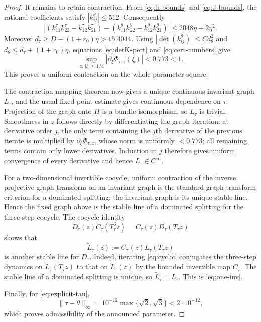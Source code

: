 \documentclass[11pt]{amsart}
\theoremstyle{remark}
\begin{document}
\begin{proof}
It remains to retain contraction.  From \eqref{eq:h-bounds} and
\eqref{eq:J-bounds}, the rational coefficients satisfy
$|k_{ij}^\theta|\le512$.  Consequently
\begin{equation}\label{eq:detK-pert}
 \left|
 (k_{11}^\tau k_{22}^\tau-k_{12}^\tau k_{21}^\tau)
 -(k_{11}^\theta k_{22}^\theta-k_{12}^\theta k_{21}^\theta)
 \right|
 \le2048\eta+2\eta^2.
\end{equation}
Moreover
$d_\tau\ge D-(1+r_0)\eta>15.4044$.  Using
$|\det(k_{ij}^\theta)|\le C d_\theta^2$ and
$d_\theta\le d_\tau+(1+r_0)\eta$, equations
\eqref{eq:detK-pert} and \eqref{eq:cert-numbers} give
\begin{equation}\label{eq:pert-contraction}
 \sup_{z,\,|\xi|\le1/4}|\partial_\xi\Phi_{\tau,z}(\xi)|<0.773<1.
\end{equation}
This proves a uniform contraction on the whole parameter square.

The contraction mapping theorem now gives a unique continuous invariant graph
$L_\tau$, and the usual fixed-point estimate gives continuous dependence on
$\tau$.  Projection of the graph onto $H$ is a bundle isomorphism, so
$L_\tau$ is trivial.  Smoothness in $z$ follows directly by differentiating
the graph iteration: at derivative order $j$, the only term containing the
$j$th derivative of the previous iterate is multiplied by
$\partial_\xi\Phi_{\tau,z}$, whose norm is uniformly $<0.773$; all remaining
terms contain only lower derivatives.  Induction in $j$ therefore gives
uniform convergence of every derivative and hence $L_\tau\in C^\infty$.

For a two-dimensional invertible cocycle, uniform contraction of the inverse
projective graph transform on an invariant graph is the standard graph-transform
criterion for a dominated splitting; the invariant graph is its unique stable
line.  Hence the fixed graph above is the stable line of a dominated splitting
for the three-step cocycle.  The cocycle identity
\begin{equation}\label{eq:cyclic}
 D_\tau(z)C_\tau(T_\tau^3z)=C_\tau(z)D_\tau(T_\tau z)
\end{equation}
shows that
\[
 \widetilde L_\tau(z):=C_\tau(z)L_\tau(T_\tau z)
\]
is another stable line for $D_\tau$.  Indeed, iterating
\eqref{eq:cyclic} conjugates the three-step dynamics on
$L_\tau(T_\tau z)$ to that on $\widetilde L_\tau(z)$ by the bounded invertible
map $C_\tau$.  The stable line of a dominated splitting is unique, so
$\widetilde L_\tau=L_\tau$.  This is \eqref{eq:one-inv}.

Finally, for \eqref{eq:explicit-tau},
\[
 \|\tau-\theta\|_\infty
 =10^{-12}\max\{\sqrt2,\sqrt3\}
 <2\cdot10^{-12},
\]
which proves admissibility of the announced parameter.
\end{proof}
\end{document}
